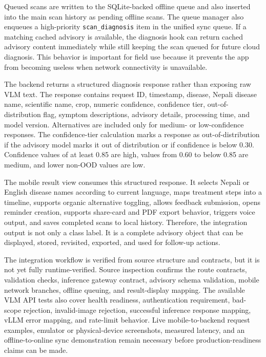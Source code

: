 Queued scans are written to the SQLite-backed offline queue and also inserted into the main scan
history as pending offline scans. The queue manager also enqueues a high-priority
\texttt{scan\_diagnosis} item in the unified sync queue. If a matching cached advisory is
available, the diagnosis hook can return cached advisory content immediately while still keeping
the scan queued for future cloud diagnosis. This behavior is important for field use because it
prevents the app from becoming useless when network connectivity is unavailable.


The backend returns a structured diagnosis response rather than exposing raw VLM text. The response
contains request ID, timestamp, disease, Nepali disease name, scientific name, crop, numeric
confidence, confidence tier, out-of-distribution flag, symptom descriptions, advisory details,
processing time, and model version. Alternatives are included only for medium- or low-confidence
responses. The confidence-tier calculation marks a response as out-of-distribution if the advisory
model marks it out of distribution or if confidence is below 0.30. Confidence values of at least
0.85 are high, values from 0.60 to below 0.85 are medium, and lower non-OOD values are low.

The mobile result view consumes this structured response. It selects Nepali or English disease
names according to current language, maps treatment steps into a timeline, supports organic
alternative toggling, allows feedback submission, opens reminder creation, supports share-card and
PDF export behavior, triggers voice output, and saves completed scans to local history. Therefore,
the integration output is not only a class label. It is a complete advisory object that can be
displayed, stored, revisited, exported, and used for follow-up actions.


The integration workflow is verified from source structure and contracts, but it is not yet fully
runtime-verified. Source inspection confirms the route contracts, validation checks, inference
gateway contract, advisory schema validation, mobile network branches, offline queuing, and
result-display mapping.
The available VLM API tests also cover health readiness, authentication requirement, bad-scope
rejection, invalid-image rejection, successful inference response mapping, vLLM error mapping, and
rate-limit behavior. Live mobile-to-backend request examples, emulator or physical-device
screenshots, measured latency, and an offline-to-online sync demonstration remain necessary
before production-readiness claims can be made.

